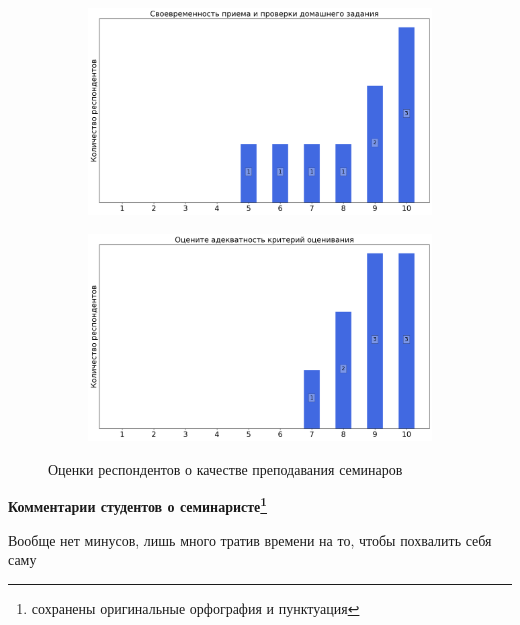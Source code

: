 \begin{figure}[H]
\begin{subfigure}[b]{0.45\textwidth}
                \includegraphics[width=\textwidth]{images/1 course/Аналитическая геометрия/seminarists-marks-Глухова Е.В.-2.png}
            \end{subfigure}
            \begin{subfigure}[b]{0.45\textwidth}
                \centering
                \includegraphics[width=\textwidth]{images/1 course/Аналитическая геометрия/seminarists-marks-Глухова Е.В.-3.png}
            \end{subfigure}	
            \caption{Оценки респондентов о качестве преподавания семинаров}
        \end{figure}

        \textbf{Комментарии студентов о семинаристе\protect\footnote{сохранены оригинальные орфография и пунктуация}}
            \begin{commentbox} 
                Вообще нет минусов, лишь много тратив времени на то, чтобы похвалить себя саму 
            \end{commentbox} 
        
